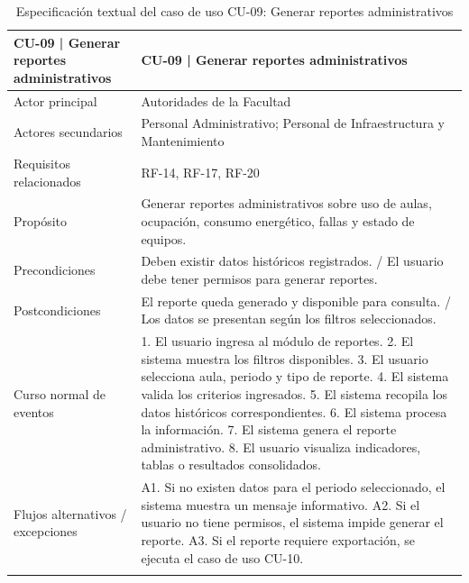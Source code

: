 \begingroup
\small
\begin{longtable}{|P{0.5000}|P{0.5000}|}
\hline
CU-09 | Generar reportes administrativos & CU-09 | Generar reportes administrativos \\ \hline
Actor principal & Autoridades de la Facultad \\ \hline
Actores secundarios & Personal Administrativo; Personal de Infraestructura y Mantenimiento \\ \hline
Requisitos relacionados & RF-14, RF-17, RF-20 \\ \hline
Propósito & Generar reportes administrativos sobre uso de aulas, ocupación, consumo energético, fallas y estado de equipos. \\ \hline
Precondiciones & Deben existir datos históricos registrados. / El usuario debe tener permisos para generar reportes. \\ \hline
Postcondiciones & El reporte queda generado y disponible para consulta. / Los datos se presentan según los filtros seleccionados. \\ \hline
Curso normal de eventos & 1. El usuario ingresa al módulo de reportes. 2. El sistema muestra los filtros disponibles. 3. El usuario selecciona aula, periodo y tipo de reporte. 4. El sistema valida los criterios ingresados. 5. El sistema recopila los datos históricos correspondientes. 6. El sistema procesa la información. 7. El sistema genera el reporte administrativo. 8. El usuario visualiza indicadores, tablas o resultados consolidados. \\ \hline
Flujos alternativos / excepciones & A1. Si no existen datos para el periodo seleccionado, el sistema muestra un mensaje informativo. A2. Si el usuario no tiene permisos, el sistema impide generar el reporte. A3. Si el reporte requiere exportación, se ejecuta el caso de uso CU-10. \\ \hline
\caption{Especificación textual del caso de uso CU-09: Generar reportes administrativos}
\end{longtable}
\endgroup

